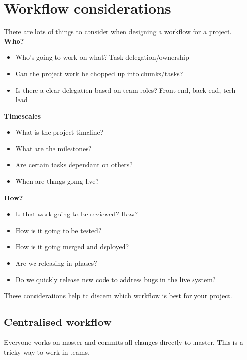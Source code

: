 \section{Workflow considerations}

There are lots of things to consider when designing a workflow for a project.
\\

\textbf{Who?}

\begin{itemize}
    \item Who’s going to work on what? Task delegation/ownership
    \item Can the project work be chopped up into chunks/tasks?
    \item Is there a clear delegation based on team roles? Front-end, back-end, tech lead
\end{itemize}

\textbf{Timescales}

\begin{itemize}
    \item What is the project timeline?
    \item What are the milestones?
	\item Are certain tasks dependant on others?
	\item When are things going live?
\end{itemize}

\textbf{How?}

\begin{itemize}
    \item Is that work going to be reviewed? How?
	\item How is it going to be tested?
	\item How is it going merged and deployed?
	\item Are we releasing in phases?
	\item Do we quickly release new code to address bugs in the live system?
\end{itemize}

These considerations help to discern which workflow is best for your project.


\subsection{Centralised workflow}

Everyone works on master and commits all changes directly to master. This is a tricky way to work in teams.
\\

